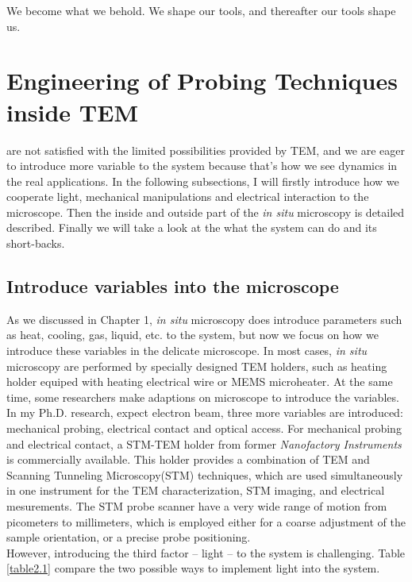 

\begin{savequote}[75mm] 
We become what we behold. We shape our tools, and thereafter our tools shape us.
\end{savequote}

\chapter{Engineering of Probing Techniques inside TEM}

 are not satisfied with the limited possibilities provided by TEM, and we are eager to introduce more variable to the system because that's how we see dynamics in the real applications. In the following subsections, I will firstly introduce how we cooperate light, mechanical manipulations and electrical interaction to the microscope. Then the inside and outside part of the \emph{in situ} microscopy is detailed described. Finally we will take a look at the what the system can do and its short-backs. 

\section{Introduce variables into the microscope}
As we discussed in Chapter 1, \emph{in situ} microscopy does introduce parameters such as heat, cooling, gas, liquid, etc. to the system, but now we focus on how we introduce these variables in the delicate microscope. In most cases, {\em in situ} microscopy are performed by specially designed TEM holders, such as heating holder equiped with heating electrical wire or MEMS microheater. At the same time, some researchers make adaptions on microscope to introduce the variables. In my Ph.D. research, expect electron beam, three more variables are introduced: mechanical probing, electrical contact and optical access. For mechanical probing and electrical contact, a STM-TEM holder from former {\em Nanofactory Instruments} is commercially available. This holder provides a combination of TEM and Scanning Tunneling Microscopy(STM) techniques, which are used simultaneously in one instrument for the TEM characterization, STM imaging, and electrical mesurements. The STM probe scanner have a very wide range of motion from picometers to millimeters, which is employed either for a coarse adjustment of the sample orientation, or a precise probe positioning. \\
However, introducing the third factor -- light -- to the system is challenging. Table \ref{table2.1} compare the two possible ways to implement light into the system. 

